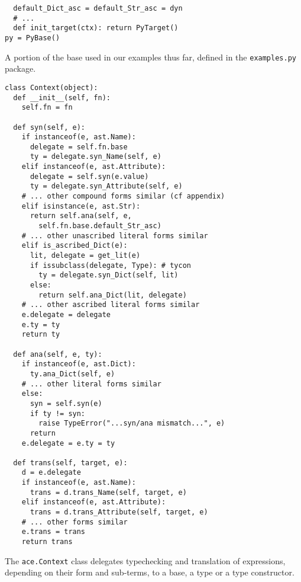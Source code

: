 \documentclass[10pt,preprint]{sigplanconf}
\begin{document}
{\begin{codelisting}
\begin{lstlisting}
  default_Dict_asc = default_Str_asc = dyn
  # ...
  def init_target(ctx): return PyTarget()   
py = PyBase()
\end{lstlisting}
\caption{A portion of the base used in our examples thus far, defined in the \texttt{examples.py} package.}
\label{pybase}
\end{codelisting}

\begin{codelisting}
\begin{lstlisting}
class Context(object):
  def __init__(self, fn):
    self.fn = fn
    
  def syn(self, e):
    if instanceof(e, ast.Name):
      delegate = self.fn.base
      ty = delegate.syn_Name(self, e)
    elif instanceof(e, ast.Attribute):
      delegate = self.syn(e.value)
      ty = delegate.syn_Attribute(self, e)
    # ... other compound forms similar (cf appendix)
    elif isinstance(e, ast.Str):
      return self.ana(self, e, 
        self.fn.base.default_Str_asc)
    # ... other unascribed literal forms similar
    elif is_ascribed_Dict(e):
      lit, delegate = get_lit(e)
      if issubclass(delegate, Type): # tycon
        ty = delegate.syn_Dict(self, lit)
      else:
        return self.ana_Dict(lit, delegate)
    # ... other ascribed literal forms similar
    e.delegate = delegate
    e.ty = ty
    return ty
    
  def ana(self, e, ty):
    if instanceof(e, ast.Dict):
      ty.ana_Dict(self, e)
    # ... other literal forms similar
    else:
      syn = self.syn(e)
      if ty != syn:
        raise TypeError("...syn/ana mismatch...", e)
      return
    e.delegate = e.ty = ty
    
  def trans(self, target, e):
    d = e.delegate
    if instanceof(e, ast.Name): 
      trans = d.trans_Name(self, target, e)
    elif instanceof(e, ast.Attribute):
      trans = d.trans_Attribute(self, target, e)
	# ... other forms similar
	e.trans = trans
	return trans
\end{lstlisting}
\caption{The \texttt{ace.Context} class delegates typechecking and translation of expressions, depending on their form and sub-terms, to a base, a type or a type constructor.}
\label{context}
\end{codelisting}


}
\end{document}
